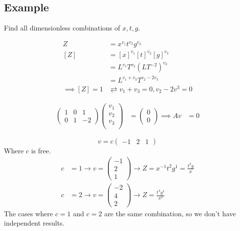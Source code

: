 \documentclass[12pt,twoside]{article}
\begin{document}
\subsection{Example}
Find all dimensionless combinations of $x, t, g$.

\begin{equation}
  \begin{aligned}
    Z &= x^{v_1}t^{v_2}g^{v_3} \\
    [Z] &= {[x]}^{v_1}{[t]}^{v_2}{[g]}^{v_3} \\
    &= L^{v_1}T^{v_2}{(LT^{-2})}^{v_3} \\
    &= L^{v_1+v_3} T^{v_2-2v_3} \\
    \implies [Z] = 1 & \rightleftarrows  v_1+v_3=0, v_2-2v^3=0
  \end{aligned}
\end{equation}

\begin{equation}
  \begin{aligned}
    \begin{pmatrix}
      1 & 0 & 1 \\
      0 & 1 & -2
    \end{pmatrix}
    \begin{pmatrix}
      v_1 \\ v_2 \\ v_3 \\
    \end{pmatrix}
    &=
    \begin{pmatrix}
      0 \\ 0
    \end{pmatrix}
    \implies Av &= 0
  \end{aligned}
\end{equation}

\begin{equation}
  v = c
  \begin{pmatrix}
    -1 & 2 & 1
  \end{pmatrix}
\end{equation}
Where $c$ is free.
\begin{equation}
  \begin{aligned}
    c &= 1 \rightarrow v =
    \begin{pmatrix}
      -1 \\ 2 \\ 1
    \end{pmatrix} \rightarrow
    Z = x^{-1} t^2 g^1 = \frac{t^2g}{x} \\
    c &= 2 \rightarrow v=
    \begin{pmatrix}
      -2 \\ 4 \\ 2
    \end{pmatrix} \rightarrow
    Z = \frac{t^4g^1}{x^2}
  \end{aligned}
\end{equation}
The cases where $c=1$ and $c=2$ are the same combination, so we don't have
independent results.
\end{document}
